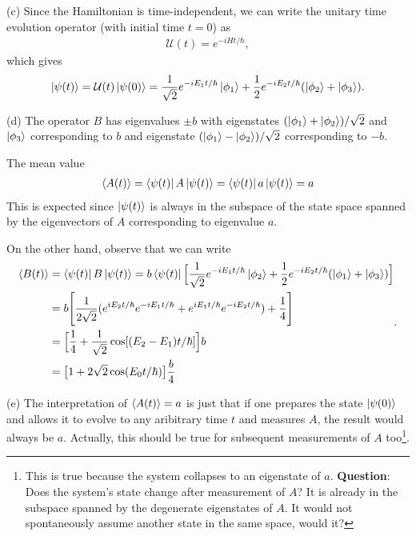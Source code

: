 {(c) Since the Hamiltonian is time-independent, we can write the unitary time evolution operator (with initial time $t = 0$) as
\begin{eqnarray}
    \mathcal{U}(t) = e^{-i H t / \hbar}
,\end{eqnarray}
which gives
\begin{eqnarray}
    \ket{\psi(t)} = \mathcal{U}(t) \ket{\psi(0)} = \frac{1}{\sqrt{2}} e^{-i E_1 t / \hbar} \ket{\phi_1} + \frac{1}{2} e^{-i E_2 t / \hbar} ( \ket{\phi_2} + \ket{\phi_3} )
.\end{eqnarray}

(d) The operator $B$ has eigenvalues $\pm b$ with eigenstates $( \ket{\phi_1} + \ket{\phi_2} )/\sqrt{2}$ and $\ket{\phi_3}$ corresponding to $b$ and eigenstate $( \ket{\phi_1} - \ket{\phi_2} )/\sqrt{2}$ corresponding to $-b$.

The mean value
\begin{eqnarray}
    \expval{A(t)} = \bra{\psi(t)} A \ket{\psi(t)} = \bra{\psi(t)} a \ket{\psi(t)} = a
\end{eqnarray}
This is expected since $\ket{\psi(t)}$ is always in the subspace of the state space spanned by the eigenvectors of $A$ corresponding to eigenvalue $a$.

On the other hand, observe that we can write
\begin{eqnarray}
\begin{aligned}
    \expval{B(t)} &= \bra{\psi(t)} B \ket{\psi(t)} = b \bra{\psi(t)} \Big[ \frac{1}{\sqrt{2}} e^{-i E_1 t /\hbar} \ket{\phi_2} + \frac{1}{2} e^{-i E_2 t /\hbar} ( \ket{\phi_1} + \ket{\phi_3} ) \Big] \\
                  &= b \Bigg[ \frac{1}{2\sqrt{2}} ( e^{i E_2 t /\hbar} e^{-iE_1t/\hbar} + e^{i E_1 t /\hbar} e^{-i E_2 t /\hbar} ) + \frac{1}{4} \Bigg] \\
                  &= \Big[ \frac{1}{4} + \frac{1}{\sqrt{2}} \cos[(E_2-E_1)t/\hbar] \Big] b \\
                  &= \big[ 1 + 2 \sqrt{2} \cos(E_0 t /\hbar) \big] \frac{b}{4}
\end{aligned}
.\end{eqnarray}

(e) The interpretation of $\expval{A(t)} = a$ is just that if one prepares the state $\ket{\psi(0)}$ and allows it to evolve to any aribitrary time $t$ and measures $A$, the result would always be $a$.
Actually, this should be true for subsequent measurements of $A$ too\footnote{This is true because the system collapses to an eigenstate of $a$. \textbf{Question}: Does the system's state change after measurement of $A$? It is already in the subspace spanned by the degenerate eigenstates of $A$. It would not spontaneously assume another state in the same space, would it?}.

}
